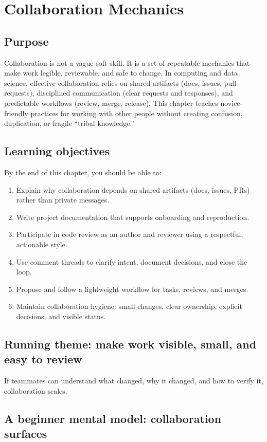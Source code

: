 \chapter{Collaboration Mechanics}
\label{ch:collaboration}

\section*{Purpose}
Collaboration is not a vague soft skill. It is a set of repeatable mechanics that make work legible, reviewable, and safe to change. In computing and data science, effective collaboration relies on shared artifacts (docs, issues, pull requests), disciplined communication (clear requests and responses), and predictable workflows (review, merge, release). This chapter teaches novice-friendly practices for working with other people without creating confusion, duplication, or fragile ``tribal knowledge.''

\section*{Learning objectives}
By the end of this chapter, you should be able to:
\begin{enumerate}
\item Explain why collaboration depends on shared artifacts (docs, issues, PRs) rather than private messages.
\item Write project documentation that supports onboarding and reproduction.
\item Participate in code review as an author and reviewer using a respectful, actionable style.
\item Use comment threads to clarify intent, document decisions, and close the loop.
\item Propose and follow a lightweight workflow for tasks, reviews, and merges.
\item Maintain collaboration hygiene: small changes, clear ownership, explicit decisions, and visible status.
\end{enumerate}

\section*{Running theme: make work visible, small, and easy to review}
If teammates can understand what changed, why it changed, and how to verify it, collaboration scales.

\section{A beginner mental model: collaboration surfaces}
